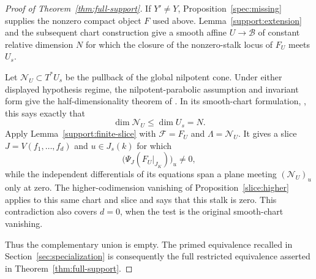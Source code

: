 \begin{proof}[Proof of Theorem~\ref{thm:full-support}]
If $Y'\ne Y$, Proposition~\ref{spec:missing} supplies the nonzero
compact object $F$ used above.  Lemma~\ref{support:extension} and the
subsequent chart construction give a smooth affine $U\to\mathcal B$
of constant relative dimension $N$ for which the closure of the
nonzero-stalk locus of $F_U$ meets $U_s$.

Let $\mathcal N_U\subset T^*U_s$ be the pullback of the global
nilpotent cone.  Under either displayed hypothesis regime, the
nilpotent-parabolic assumption and invariant form give the
half-dimensionality theorem of
\cite[Appendix~D.1.1--D.1.8]{AGKRRV}.  In its smooth-chart formulation,
\cite[Appendix~D.1.2]{AGKRRV}, this says exactly that
\[
 \dim\mathcal N_U\leq\dim U_s=N.
\]
Apply Lemma~\ref{support:finite-slice} with
$\mathcal F=F_U$ and $\Lambda=\mathcal N_U$.  It gives a slice
$J=V(f_1,\ldots,f_d)$ and $u\in J_s(k)$ for which
\[
 \bigl(\Psi_J(F_U|_{J_K})\bigr)_u\ne0,
\]
while the independent differentials of its equations span a plane
meeting $(\mathcal N_U)_u$ only at zero.  The higher-codimension
vanishing of Proposition~\ref{slice:higher} applies to this same chart
and slice and says that this stalk is zero.  This contradiction also
covers $d=0$, when the test is the original smooth-chart vanishing.

Thus the complementary union is empty.  The primed equivalence recalled
in Section~\ref{sec:specialization} is consequently the full restricted
equivalence asserted in Theorem~\ref{thm:full-support}.
\end{proof}

